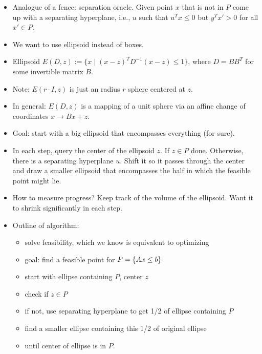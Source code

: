 \documentclass{article}
\begin{document}
\begin{itemize}
\item Analogue of a fence: separation oracle. Given point $x$ that is not in $P$  come up with a separating hyperplane, i.e., $u$ such that $u^T x \leq 0$ but $y^Tx' > 0$ for all $x'\in P$. 
\item We want to use ellipsoid instead of boxes. 
\item Ellipsoid $E(D,z):=\{x \mid (x-z)^TD^{-1}(x-z) \leq 1 \}$, where $D=BB^T$ for some invertible matrix $B$.
\item Note: $E(r\cdot I,z)$ is just an radius $r$ sphere centered at $z$. 
\item In general: $E(D,z)$ is a mapping of a unit sphere via an affine change of coordinates $x\rightarrow Bx +z$. 

\item Goal: start with a big ellipsoid that encompasses everything (for sure). 
\item In each step, query the center of the ellipsoid $z$. If $z\in P$ done. Otherwise, there is a separating hyperplane $u$. Shift it so it passes through the center and draw a smaller ellipsoid that encompasses the half in which the feasible point might lie. 
\item How to measure progress? Keep track of the volume of the ellipsoid. Want it to shrink significantly in each step. 

\item Outline of algorithm:
\begin{itemize}
	\item solve feasibility, which we know is equivalent to optimizing
	\item goal: find a feasible point for $P=\{ Ax \le b \}$
	\item start with ellipse containing $P$, center $z$
	\item check if $z \in P$
	\item if not, use separating hyperplane to get 1/2 of ellipse
	containing $P$
	\item find a smaller ellipse containing this 1/2 of original ellipse
	\item until center of ellipse is in $P$.
\end{itemize}


\end{itemize}
\end{document}
